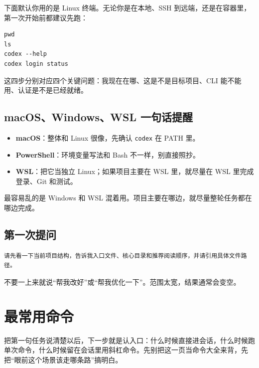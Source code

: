 \documentclass[UTF8,a4paper,11pt]{ctexart}
\begin{document}
下面默认你用的是 Linux 终端。无论你是在本地、SSH 到远端，还是在容器里，第一次开始前都建议先跑：

\begin{lstlisting}[style=cli]
pwd
ls
codex --help
codex login status
\end{lstlisting}

这四步分别对应四个关键问题：我现在在哪、这是不是目标项目、CLI 能不能用、认证是不是已经就绪。

\subsection{macOS、Windows、WSL 一句话提醒}

\begin{itemize}
  \item \textbf{macOS}：整体和 Linux 很像，先确认 \texttt{codex} 在 PATH 里。
  \item \textbf{PowerShell}：环境变量写法和 Bash 不一样，别直接照抄。
  \item \textbf{WSL}：把它当独立 Linux；如果项目主要在 WSL 里，就尽量在 WSL 里完成登录、Git 和测试。
\end{itemize}

\begin{warnbox}
最容易乱的是 Windows 和 WSL 混着用。项目主要在哪边，就尽量整轮任务都在哪边完成。
\end{warnbox}

\subsection{第一次提问}

\begin{lstlisting}[style=prompt]
请先看一下当前项目结构，告诉我入口文件、核心目录和推荐阅读顺序，并请引用具体文件路径。
\end{lstlisting}

\begin{warnbox}
不要一上来就说“帮我改好”或“帮我优化一下”。范围太宽，结果通常会变空。
\end{warnbox}

\section{最常用命令}

把第一句任务说清楚以后，下一步就是认入口：什么时候直接进会话，什么时候跑单次命令，什么时候留在会话里用斜杠命令。先别把这一页当命令大全来背，先把“眼前这个场景该走哪条路”搞明白。
\end{document}
